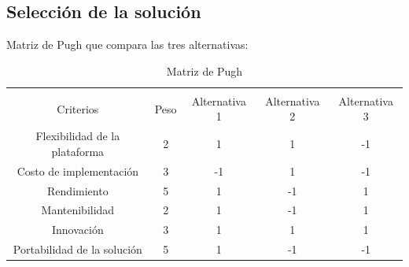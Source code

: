\documentclass[12pt]{article}
\begin{document}
\subsection{Selección de la solución}

Matriz de Pugh que compara las tres alternativas:

\begin{table}[h!]
  \caption{Matriz de Pugh}{
  \begin{tabular}{ccccc}
  \hline
  \multicolumn{1}{|c|}{\cellcolor[HTML]{93C47D}} &
    \multicolumn{1}{c|}{\cellcolor[HTML]{93C47D}} &
    \multicolumn{1}{c|}{\cellcolor[HTML]{93C47D}} &
    \multicolumn{1}{c|}{\cellcolor[HTML]{93C47D}} &
    \multicolumn{1}{c|}{\cellcolor[HTML]{93C47D}} \\
  \multicolumn{1}{|c|}{\multirow{-2}{*}{\cellcolor[HTML]{93C47D} Criterios}} &
    \multicolumn{1}{c|}{\multirow{-2}{*}{\cellcolor[HTML]{93C47D} Peso}} &
    \multicolumn{1}{c|}{\multirow{-2}{*}{\cellcolor[HTML]{93C47D} Alternativa 1}} &
    \multicolumn{1}{c|}{\multirow{-2}{*}{\cellcolor[HTML]{93C47D} Alternativa 2}} &
    \multicolumn{1}{c|}{\multirow{-2}{*}{\cellcolor[HTML]{93C47D} Alternativa 3}} \\ \hline
  \multicolumn{1}{|c|}{\cellcolor[HTML]{93C47D} Flexibilidad de la plataforma} &
    \multicolumn{1}{c|}{2} &
    \multicolumn{1}{c|}{1} &
    \multicolumn{1}{c|}{1} &
    \multicolumn{1}{c|}{-1} \\ \hline
  \multicolumn{1}{|c|}{\cellcolor[HTML]{93C47D} Costo de implementación} &
    \multicolumn{1}{c|}{3} &
    \multicolumn{1}{c|}{-1} &
    \multicolumn{1}{c|}{1} &
    \multicolumn{1}{c|}{-1} \\ \hline
  \multicolumn{1}{|c|}{\cellcolor[HTML]{93C47D} Rendimiento} &
    \multicolumn{1}{c|}{5} &
    \multicolumn{1}{c|}{1} &
    \multicolumn{1}{c|}{-1} &
    \multicolumn{1}{c|}{1} \\ \hline
  \multicolumn{1}{|c|}{\cellcolor[HTML]{93C47D} Mantenibilidad} &
    \multicolumn{1}{c|}{2} &
    \multicolumn{1}{c|}{1} &
    \multicolumn{1}{c|}{-1} &
    \multicolumn{1}{c|}{1} \\ \hline
  \multicolumn{1}{|c|}{\cellcolor[HTML]{93C47D} Innovación} &
    \multicolumn{1}{c|}{3} &
    \multicolumn{1}{c|}{1} &
    \multicolumn{1}{c|}{1} &
    \multicolumn{1}{c|}{1} \\ \hline
  \multicolumn{1}{|c|}{\cellcolor[HTML]{93C47D} Portabilidad de la solución} &
    \multicolumn{1}{c|}{5} &
    \multicolumn{1}{c|}{1} &
    \multicolumn{1}{c|}{-1} &
    \multicolumn{1}{c|}{-1} \\ \hline

\end{tabular}}
\end{table}
\end{document}
